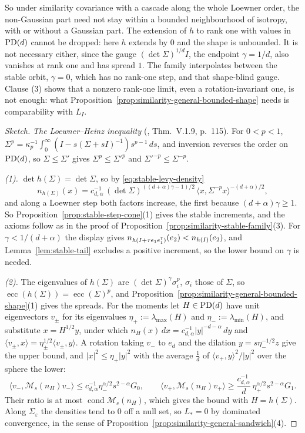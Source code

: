 So under similarity covariance with a cascade along the whole Loewner order, the non-Gaussian part
need not stay within a bounded neighbourhood of isotropy, with or without a Gaussian part. The
extension of $h$ to rank one with values in $\mathrm{PD}(d)$ cannot be dropped: here $h$ extends by $0$ and the
shape is unbounded. It is not necessary either, since the gauge $(\det\Sigma)^{1/d}I$, the endpoint
$\gamma = 1/d$, also vanishes at rank one and has spread $1$. The family interpolates between the stable
orbit, $\gamma = 0$, which has no rank-one step, and that shape-blind gauge. Clause (3) shows that a
nonzero rank-one limit, even a rotation-invariant one, is not enough: what
Proposition~\ref{prop:similarity-general-bounded-shape} needs is comparability with $L_I$.

\begin{proof}[Sketch]
\emph{The Loewner--Heinz inequality} (, Thm.~V.1.9, p.~115). For $0 < p < 1$,
$\Sigma^p = \kappa_p^{-1}\int_0^\infty(I - s(\Sigma + sI)^{-1})s^{p-1}\,ds$, and inversion reverses the
order on $\mathrm{PD}(d)$, so $\Sigma \le \Sigma'$ gives $\Sigma^p \le \Sigma'^p$ and $\Sigma'^{-p} \le \Sigma^{-p}$.

\emph{(1).} $\det h(\Sigma) = \det\Sigma$, so by \ref{eq:stable-levy-density}
\[
  n_{h(\Sigma)}(x) = c_{d,\alpha}^{-1}\,(\det\Sigma)^{((d+\alpha)\gamma - 1)/2}\,\langle x,\Sigma^{-p}x\rangle^{-(d+\alpha)/2} ,
\]
and along a Loewner step both factors increase, the first because $(d+\alpha)\gamma \ge 1$. So
Proposition~\ref{prop:stable-step-cone}(1) gives the stable increments, and the axioms follow as in the
proof of Proposition~\ref{prop:similarity-stable-family}(3). For $\gamma < 1/(d+\alpha)$ the display gives
$n_{h(I + \tau e_1e_1^{\mathsf{T}})}(e_2) < n_{h(I)}(e_2)$, and Lemma~\ref{lem:stable-tail} excludes a positive
increment, so the lower bound on $\gamma$ is needed.

\emph{(2).} The eigenvalues of $h(\Sigma)$ are $(\det\Sigma)^\gamma\sigma_i^p$, $\sigma_i$ those of $\Sigma$,
so $\operatorname{ecc}(h(\Sigma)) = \operatorname{ecc}(\Sigma)^p$, and
Proposition~\ref{prop:similarity-general-bounded-shape}(1) gives the spreads. For the moments let $H \in \mathrm{PD}(d)$ have
unit eigenvectors $v_\pm$ for its eigenvalues $\eta_+ := \lambda_{\max}(H)$ and
$\eta_- := \lambda_{\min}(H)$, and substitute $x = H^{1/2}y$, under which
$n_H(x)\,dx = c_{d,\alpha}^{-1}|y|^{-d-\alpha}\,dy$ and $\langle v_\pm,x\rangle = \eta_\pm^{1/2}\langle v_\pm,y\rangle$.
A rotation taking $v_-$ to $e_d$ and the dilation $y = s\eta_-^{-1/2}z$ give the upper bound, and
$|x|^2 \le \eta_+|y|^2$ with the average $\tfrac1d$ of $\langle v_+,y\rangle^2/|y|^2$ over the sphere the lower:
\[
  \langle v_-,\mathcal M_s(n_H)v_-\rangle \le c_{d,\alpha}^{-1}\eta_-^{\alpha/2}s^{2-\alpha}G_0 ,
  \qquad
  \langle v_+,\mathcal M_s(n_H)v_+\rangle \ge \frac{c_{d,\alpha}^{-1}}{d}\,\eta_+^{\alpha/2}s^{2-\alpha}G_1 .
\]
Their ratio is at most $\operatorname{cond}\mathcal M_s(n_H)$, which gives the bound with $H = h(\Sigma)$.
Along $\Sigma_\varepsilon$ the densities tend to $0$ off a null set, so $L_* = 0$ by dominated convergence,
in the sense of Proposition~\ref{prop:similarity-general-sandwich}(4).


\end{proof}
